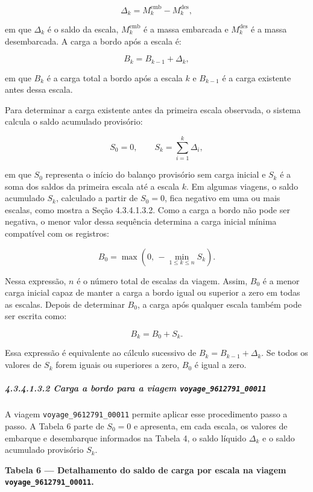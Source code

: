 \documentclass[brazil,]{article}
\let\oldsubparagraph\subparagraph
\renewcommand{\subparagraph}[1]{\Needspace{6\baselineskip}\oldsubparagraph{#1}\mbox{}}
\newcommand{\keeptable}{\Needspace{0.64\textheight}}
\begin{document}
\[
\Delta_k=M_k^{\mathrm{emb}}-M_k^{\mathrm{des}},
\]

em que \(\Delta_k\) é o saldo da escala, \(M_k^{\mathrm{emb}}\) é a massa
embarcada e \(M_k^{\mathrm{des}}\) é a massa desembarcada. A carga a
bordo após a escala é:

\[
B_k=B_{k-1}+\Delta_k,
\]

em que \(B_k\) é a carga total a bordo após a escala \(k\) e
\(B_{k-1}\) é a carga existente antes dessa escala.

Para determinar a carga existente antes da primeira escala observada, o
sistema calcula o saldo acumulado provisório:

\[
S_0=0,
\qquad
S_k=\sum_{i=1}^{k}\Delta_i,
\]

em que \(S_0\) representa o início do balanço provisório sem carga
inicial e \(S_k\) é a soma dos saldos da primeira escala até a escala
\(k\). Em algumas viagens, o saldo acumulado \(S_k\), calculado a partir
de \(S_0=0\), fica negativo em uma ou mais escalas, como mostra a Seção
4.3.4.1.3.2. Como a carga a bordo não pode ser negativa, o menor valor
dessa sequência determina a carga inicial mínima compatível com os
registros:

\[
B_0=
\max\left(
0,\,
-\min_{1\leq k\leq n}S_k
\right).
\]

Nessa expressão, \(n\) é o número total de escalas da viagem. Assim,
\(B_0\) é a menor carga inicial capaz de manter a carga a bordo igual ou
superior a zero em todas as escalas. Depois de determinar \(B_0\), a
carga após qualquer escala também pode ser escrita como:

\[
B_k=B_0+S_k.
\]

Essa expressão é equivalente ao cálculo sucessivo de
\(B_k=B_{k-1}+\Delta_k\). Se todos os valores de \(S_k\) forem iguais ou
superiores a zero, \(B_0\) é igual a zero.

\hypertarget{carga-a-bordo-para-a-viagem-voyage-9612791-00011}{%
\subparagraph{\texorpdfstring{4.3.4.1.3.2 Carga a bordo para a viagem
\texttt{voyage\_9612791\_00011}}{4.3.4.1.3.2 Carga a bordo para a viagem voyage\_9612791\_00011}}\label{carga-a-bordo-para-a-viagem-voyage-9612791-00011}}

A viagem \texttt{voyage\_9612791\_00011} permite aplicar esse
procedimento passo a passo. A Tabela 6 parte de \(S_0=0\) e
apresenta, em cada escala, os valores de embarque e desembarque
informados na Tabela 4, o saldo líquido \(\Delta_k\) e o saldo acumulado
provisório \(S_k\).

\keeptable
\textbf{Tabela 6 --- Detalhamento do saldo de carga por escala na viagem
\texttt{voyage\_9612791\_00011}.}
\end{document}
